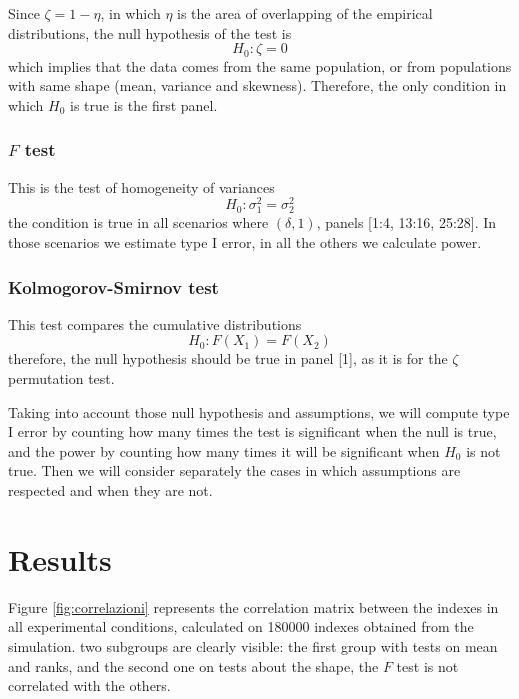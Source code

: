 \documentclass[10pt]{article}\usepackage[]{graphicx}\usepackage[]{xcolor}
\begin{document}
Since $\zeta = 1 - \eta$, in which $\eta$ is the area of overlapping of the empirical distributions, the null hypothesis of the test is $$H_0: \zeta = 0$$ which implies that the data comes from the same population, or from populations with same shape (mean, variance and skewness). Therefore, the only condition in which $H_0$ is true is the first panel. 

\subsubsection{$F$ test}

This is the test of homogeneity of variances $$H_0: \sigma^2_1 = \sigma^2_2$$ the condition is true in all scenarios where $(\delta,1)$, panels [1:4, 13:16, 25:28]. In those scenarios we estimate type I error, in all the others we calculate power.

\subsubsection{Kolmogorov-Smirnov test}

This test compares the cumulative distributions $$H_0: F(X_1) = F(X_2)$$ therefore, the null hypothesis should be true in panel [1], as it is for the $\zeta$ permutation test.

Taking into account those null hypothesis and assumptions, we will compute type I error by counting how many times the test is significant when the null is true, and the power by counting how many times it will be significant when $H_0$ is not true. Then we will consider separately the cases in which assumptions are respected and when they are not.

\section{Results}

Figure \ref{fig:correlazioni} represents the correlation matrix between the indexes in all experimental conditions, calculated on 180000 indexes obtained from the simulation. two subgroups are clearly visible: the first group with tests on mean and ranks, and the second one on tests about the shape, the $F$ test is not correlated with the others. 
\end{document}
